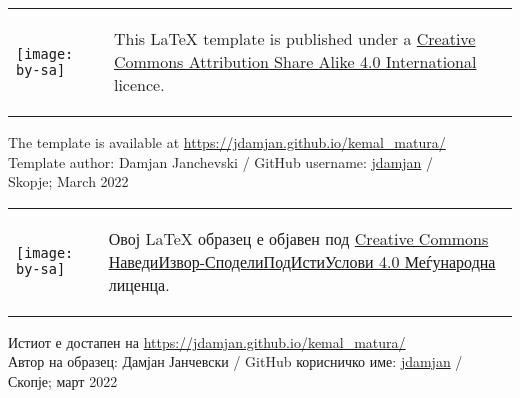 \thispagestyle{empty}
\vspace*{\fill}
\begin{table}[h!]
  \begin{tabular}{ ll }
    \begin{minipage}{.25\textwidth}
    \begin{flushleft}
      \texttt{[image: by-sa]}
    \end{flushleft}
    \end{minipage}
    &
    \begin{minipage}{.7\textwidth}
    \begin{flushleft}
    This \LaTeX \hspace{0.03cm} template is published under a \href{https://creativecommons.org/licenses/by-sa/4.0/}{ Creative Commons Attribution Share Alike 4.0 International} licence.
    \end{flushleft}
    \end{minipage}
  \end{tabular}
\end{table}
\noindent The template is available at \url{https://jdamjan.github.io/kemal_matura/}\\
Template author: Damjan Janchevski / GitHub username: \href{https://github.com/jdamjan}{jdamjan} /\\
Skopje; March 2022

\begin{table}[h!]
  \begin{tabular}{ ll }
    \begin{minipage}{.25\textwidth}
    \begin{flushleft}
      \texttt{[image: by-sa]}
    \end{flushleft}
    \end{minipage}
    &
    \begin{minipage}{.7\textwidth}
    \begin{flushleft}
    Овој \LaTeX \hspace{0.03cm} образец е објавен под \href{https://creativecommons.org/licenses/by-sa/4.0/}{Creative Commons НаведиИзвор-СподелиПодИстиУслови 4.0 Меѓународна} лиценца.
    \end{flushleft}
    \end{minipage}
  \end{tabular}
\end{table}
\noindent Истиот е достапен на \url{https://jdamjan.github.io/kemal_matura/}\\
Автор на образец: Дамјан Јанчевски / GitHub корисничко име: \href{https://github.com/jdamjan}{jdamjan} /\\
Скопје; март 2022
